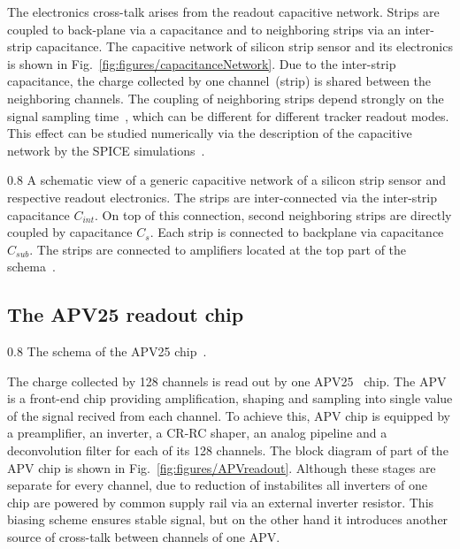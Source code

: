 The electronics cross-talk arises from the readout capacitive network. Strips are coupled to back-plane via a capacitance and to neighboring strips via an inter-strip capacitance. The capacitive network of silicon strip sensor and its electronics is shown in Fig.~\ref{fig:figures/capacitanceNetwork}. Due to the inter-strip capacitance, the charge collected by one channel~(strip) is shared between the neighboring channels. The coupling of neighboring strips depend strongly on the signal sampling time~\cite{Bloch:2007zza}, which can be different for different tracker readout modes. This effect can be studied numerically via the description of the capacitive network by the SPICE simulations~\cite{Barberis:1993ph}.


                 {0.8}       %
                 {A schematic view of a generic capacitive network of a silicon strip sensor and respective readout electronics. The strips are inter-connected via the inter-strip capacitance $C_{int}$. On top of this connection, second neighboring strips are directly coupled by capacitance $C_{s}$. Each strip is connected to backplane via capacitance $C_{sub}$. The strips are connected to amplifiers located at the top part of the schema~\cite{Lutz:1987wd}.}




\subsection{The APV25 readout chip \label{sec:APV}}


                 {0.8}       %
                 {The schema of the APV25 chip~\cite{Friedl:2001kra}.} %

The charge collected by 128 channels is read out by one APV25~\cite{French:2001xb} chip. The APV is a front-end chip providing amplification, shaping and sampling into single value of the signal recived from each channel. To achieve this, APV chip is equipped by a preamplifier, an inverter, a CR-RC shaper, an analog pipeline and a deconvolution filter for each of its 128 channels. The block diagram of part of the APV chip is shown in Fig.~\ref{fig:figures/APVreadout}. Although these stages are separate for every channel, due to reduction of instabilites all inverters of one chip are powered by common supply rail via an external inverter resistor. This biasing scheme ensures stable signal, but on the other hand it introduces another source of cross-talk between channels of one APV.

